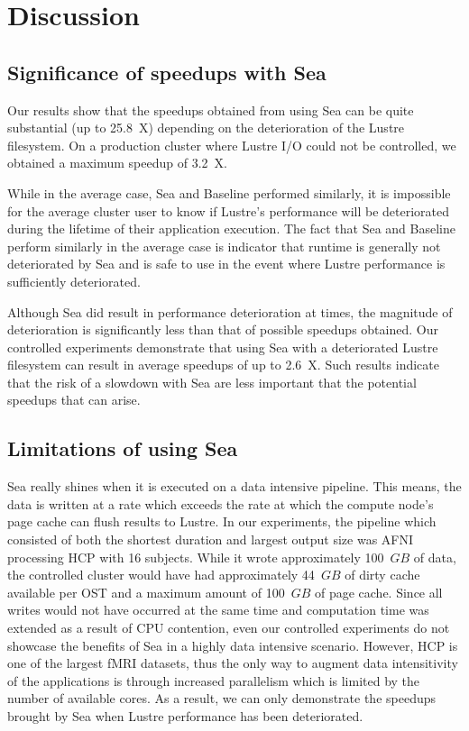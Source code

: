    
    
    \section{Discussion}
    \subsection{Significance of speedups with Sea}

    Our results show that the speedups obtained from
    using Sea can be quite substantial (up to 25.8~X)
    depending on the deterioration of the Lustre
    filesystem. On a production cluster where Lustre I/O could not be controlled, we obtained a maximum speedup of 3.2~X.

    While in the average case, Sea and Baseline performed similarly, it is impossible for the
    average cluster user to know if Lustre's performance
    will be deteriorated during the lifetime of their
    application execution. The fact that Sea and Baseline perform similarly in the average case is indicator that runtime is generally not
    deteriorated by Sea and is safe to use in the event where Lustre performance is sufficiently deteriorated.

    Although Sea did result in performance deterioration at times, the magnitude of deterioration is significantly less than that of possible speedups obtained. Our controlled experiments demonstrate that using Sea with a deteriorated Lustre filesystem can result in average speedups of up to 2.6~X. Such results indicate that the risk of a slowdown with Sea are less important that the potential speedups that can arise.

    \subsection{Limitations of using Sea}
    
    Sea really shines when it is executed on a data intensive pipeline.
    This means, the data is written at a rate which exceeds the rate at
    which the compute node's page cache can flush results to Lustre. In
    our experiments, the pipeline which consisted of both the shortest
    duration and largest output size was AFNI processing HCP with 16 subjects.
    While it wrote approximately 100~$GB$ of data, the controlled cluster would
    have had approximately 44~$GB$ of dirty cache available per OST and a maximum
    amount of 100~$GB$ of page cache. Since all writes would not have occurred at the same time
    and computation time was extended as a result of CPU contention, even our controlled experiments
    do not showcase the benefits of Sea in a highly data intensive scenario. However, HCP is one of the largest fMRI datasets, thus the only way to augment data intensitivity of the applications is through increased parallelism which is limited by the number of available cores. As a result, we can
    only demonstrate the speedups brought by Sea when Lustre performance has been deteriorated.


